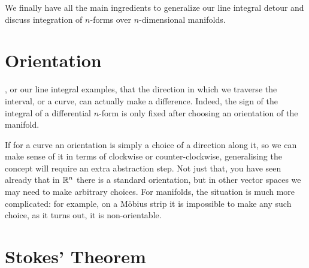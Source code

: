 We finally have all the main ingredients to generalize our line integral detour and discuss integration of $n$-forms over $n$-dimensional manifolds.

\section{Orientation}

, or our line integral examples, that the direction in which we traverse the interval, or a curve, can actually make a difference.
Indeed, the sign of the integral of a differential $n$-form is only fixed after choosing an orientation of the manifold.

If for a curve an orientation is simply a choice of a direction along it, so we can make sense of it in terms of clockwise or counter-clockwise, generalising the concept will require an extra abstraction step.
Not just that, you have seen already that in $\mathbb{R}^n$ there is a standard orientation, but in other vector spaces we may need to make arbitrary choices.
For manifolds, the situation is much more complicated: for example, on a M\"obius strip it is impossible to make any such choice, as it turns out, it is non-orientable.

\section{Stokes' Theorem}
